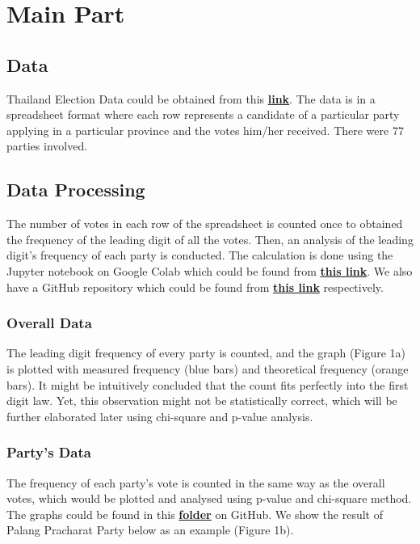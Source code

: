 \documentclass[12pt]{article}
\begin{document}
\section{Main Part}

\subsection{Data}
Thailand Election Data \cite{election} could be obtained from this \href{https://www.ect.go.th/ewt/ewt/ect_th/download/article/article_20190328165029.pdf}{\textbf{link}}. The data is in a spreadsheet format where each row represents a candidate of a particular party applying in a particular province and the votes him/her received. There were 77 parties involved.

\subsection{Data Processing}
The number of votes in each row of the spreadsheet is counted once to obtained the frequency of the leading digit of all the votes. Then, an analysis of the leading digit's frequency of each party is conducted. The calculation is done using the Jupyter notebook on Google Colab which could be found from \href{https://colab.research.google.com/drive/1Y7lz2Er4WxXexss0tcbCmE-tPEKGnbBs?usp=sharing}{\textbf{this link}}. We also have a GitHub repository which could be found from  \href{https://github.com/pond-nj/Benford-s-Law-Analysis}{\textbf{this link}} respectively.

\subsubsection* {Overall Data}
The leading digit frequency of every party is counted, and the graph (Figure 1a) is plotted with measured frequency (blue bars) and theoretical frequency (orange bars). It might be intuitively concluded that the count fits perfectly into the first digit law. Yet, this observation might not be statistically correct, which will be further elaborated later using chi-square and p-value analysis.

\subsubsection* {Party's Data}
The frequency of each party's vote is counted in the same way as the overall votes, which would be plotted and analysed using p-value and chi-square method. The graphs could be found in this \href{https://github.com/pond-nj/Benford-s-Law-Analysis/tree/main/thai\%20election\%20graph}{\textbf{folder}} on GitHub. We show the result of Palang Pracharat Party below as an example (Figure 1b).
\end{document}
